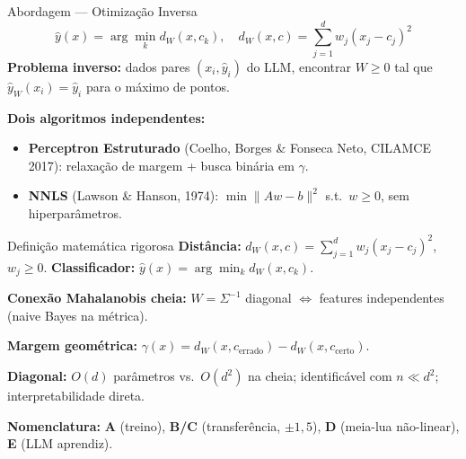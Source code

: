 \documentclass[aspectratio=169,10pt]{beamer}
\begin{document}
\begin{frame}{Abordagem --- Otimiza\c{c}\~ao Inversa}
  \footnotesize
  \[ \hat y(x) = \arg\min_k d_W(x, c_k), \quad d_W(x,c) = \sum_{j=1}^{d} w_j (x_j - c_j)^2 \]
  \textbf{Problema inverso:} dados pares $(x_i, \hat y_i)$ do LLM, encontrar $W \geq 0$ tal que $\hat y_W(x_i)=\hat y_i$ para o m\'aximo de pontos.
  \medskip

  \textbf{Dois algoritmos independentes:}
  \begin{itemize}
    \item \textbf{Perceptron Estruturado} (Coelho, Borges \& Fonseca Neto, CILAMCE 2017): relaxa\c{c}\~ao de margem + busca bin\'aria em $\gamma$.
    \item \textbf{NNLS} (Lawson \& Hanson, 1974): $\min \|Aw-b\|^2$ s.t.\ $w \geq 0$, sem hiperpar\^ametros.
  \end{itemize}
\end{frame}

\begin{frame}{Defini\c{c}\~ao matem\'atica rigorosa}
  \scriptsize
  \textbf{Dist\^ancia:} $d_W(x, c) = \sum_{j=1}^{d} w_j (x_j - c_j)^2$, $w_j \geq 0$.\quad
  \textbf{Classificador:} $\hat y(x) = \arg\min_k d_W(x, c_k)$.
  \medskip

  \textbf{Conex\~ao Mahalanobis cheia:} $W = \Sigma^{-1}$ diagonal $\Leftrightarrow$ features independentes (naive Bayes na m\'etrica).
  \medskip

  \textbf{Margem geom\'etrica:} $\gamma(x) = d_W(x, c_{\text{errado}}) - d_W(x, c_{\text{certo}})$.
  \medskip

  \textbf{Diagonal:} $O(d)$ par\^ametros vs.\ $O(d^2)$ na cheia; identific\'avel com $n \ll d^2$; interpretabilidade direta.
  \medskip

  \textbf{Nomenclatura:} \textbf{A} (treino), \textbf{B/C} (transfer\^encia, $\pm 1{,}5$), \textbf{D} (meia-lua n\~ao-linear), \textbf{E} (LLM aprendiz).
\end{frame}
\end{document}
